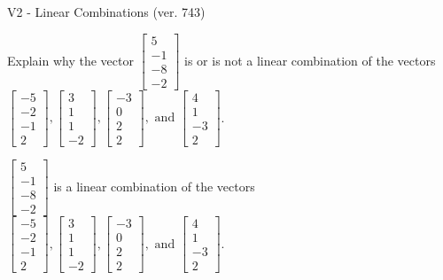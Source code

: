 \begin{exercise}
  \begin{exerciseTitle}V2 - Linear Combinations (ver. 743)\end{exerciseTitle}
  \begin{exerciseStatement}
    Explain why the vector \(\left[\begin{array}{c}
5 \\
-1 \\
-8 \\
-2
\end{array}\right]\)  is or is not a linear 
	combination of the vectors \(\left[\begin{array}{c}
-5 \\
-2 \\
-1 \\
2
\end{array}\right] , \left[\begin{array}{c}
3 \\
1 \\
1 \\
-2
\end{array}\right] , \left[\begin{array}{c}
-3 \\
0 \\
2 \\
2
\end{array}\right] , \text{ and } \left[\begin{array}{c}
4 \\
1 \\
-3 \\
2
\end{array}\right]\).
	


  \end{exerciseStatement}
  \begin{exerciseAnswer}
   \(\left[\begin{array}{c}
5 \\
-1 \\
-8 \\
-2
\end{array}\right]\) 
  	 is  
	a linear combination of the vectors \(\left[\begin{array}{c}
-5 \\
-2 \\
-1 \\
2
\end{array}\right] , \left[\begin{array}{c}
3 \\
1 \\
1 \\
-2
\end{array}\right] , \left[\begin{array}{c}
-3 \\
0 \\
2 \\
2
\end{array}\right] , \text{ and } \left[\begin{array}{c}
4 \\
1 \\
-3 \\
2
\end{array}\right]\).


\end{exerciseAnswer}
\end{exercise}
